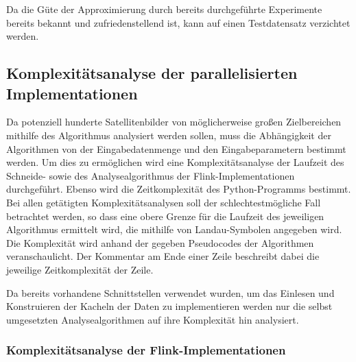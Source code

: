 Da die Güte der Approximierung durch bereits durchgeführte Experimente bereits bekannt und zufriedenstellend ist, kann auf einen Testdatensatz verzichtet werden.

\subsection{Komplexitätsanalyse der parallelisierten Implementationen}
\label{sec:ComplexityAnalysisFlink}
Da potenziell hunderte Satellitenbilder von möglicherweise großen Zielbereichen mithilfe des Algorithmus analysiert werden sollen, muss die Abhängigkeit der Algorithmen von der Eingabedatenmenge und den Eingabeparametern bestimmt werden. Um dies zu ermöglichen wird eine Komplexitätsanalyse der Laufzeit des Schneide- sowie des Analysealgorithmus der Flink-Implementationen durchgeführt. Ebenso wird die Zeitkomplexität des Python-Programms bestimmt. Bei allen getätigten Komplexitätsanalysen soll der schlechtestmögliche Fall betrachtet werden, so dass eine obere Grenze für die Laufzeit des jeweiligen Algorithmus ermittelt wird, die mithilfe von Landau-Symbolen angegeben wird. Die Komplexität wird anhand der gegeben Pseudocodes der Algorithmen veranschaulicht. Der Kommentar am Ende einer Zeile beschreibt dabei die jeweilige Zeitkomplexität der Zeile. 

Da bereits vorhandene Schnittstellen verwendet wurden, um das Einlesen und Konstruieren der Kacheln der Daten zu implementieren werden nur die selbst umgesetzten Analysealgorithmen auf ihre Komplexität hin analysiert.

\subsubsection{Komplexitätsanalyse der Flink-Implementationen}

